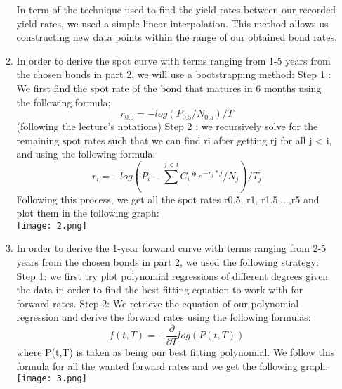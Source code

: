 \documentclass{article}
\begin{document}
\begin{enumerate}
\begin{enumerate}
        In term of the technique used to find the yield rates between our recorded yield rates, we used a simple linear interpolation. This method allows us constructing new data points within the range of our obtained bond rates. 
        \item  In order to derive the spot curve with terms ranging from 1-5 years from the chosen bonds in part 2, we will use a bootstrapping method:
        Step 1 : We first find the spot rate of the bond that matures in 6 months using the following formula;
        \begin{equation}
        r_{0.5} = -log(P_{0.5}/N_{0.5})/T
        \end{equation}
        (following the lecture's notations)
        Step 2 : we recursively solve for the remaining spot rates such that we can find ri after getting  rj  for all j < i, and using the following formula:
        \begin{equation}
        r_{i} = -log(P_{i} - \sum^{j<i}C_i*e^{-r_j*j}/N_{j})/T_j
        \end{equation}
        Following this process, we get all the spot rates r{0.5}, r{1}, r{1.5},...,r{5} and plot them in the following graph:\\
        \texttt{[image: 2.png]}
        \centering
        \item In order to derive the 1-year forward curve with terms ranging from 2-5 years from the chosen bonds in part 2, we used the following strategy:
        Step 1: we first try plot polynomial regressions of different degrees given the data in order to find the best fitting equation to work with for forward rates. Step 2: We retrieve the equation of our polynomial regression and derive the forward rates using the following formulas:
        \begin{equation}
        f(t,T) = -\frac{\partial}{\partial T} log(P(t,T))
        \end{equation}
        where P(t,T) is taken as being our best fitting polynomial.
        We follow this formula for all the wanted forward rates and we get the following graph:\\
        \texttt{[image: 3.png]}
        \centering
        

\end{enumerate}
\end{enumerate}
\end{document}

